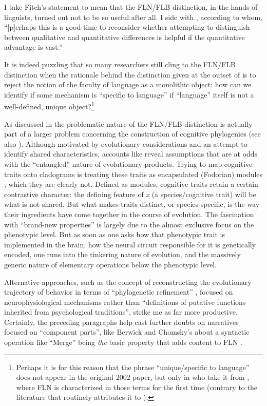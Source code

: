 I take Fitch's statement to mean that the FLN/FLB distinction, in the hands of linguists, turned out not to be so useful after all. I side with \cite{bloomfield2011birds}, according to whom, ``[p]erhaps this is a good time to reconsider whether attempting to distinguish between qualitative and quantitative differences is helpful if the quantitative advantage is vast.''

It is indeed puzzling that so many researchers still cling to the FLN/FLB distinction when the rationale behind the distinction given at the outset of \cite{hauser2002faculty} is to reject the notion of the faculty of language as a monolithic object: how can we identify if some mechanism is ``specific to language'' if ``language'' itself is not a well-defined, unique object?\footnote{Perhaps it is for this reason that the phrase
``unique/specific to language'' does not appear in the original 2002 paper, but only in \cite{fitch2005evolution} who take it from \cite{pinker2005faculty}, where FLN is characterized in those terms for the first time (contrary to the literature that routinely attributes it to \cite{hauser2002faculty}).}

As discussed in \cite{theofanopoulou2015cognitive} the problematic nature of the FLN/FLB distinction is actually part of a larger problem concerning the construction of cognitive phylogenies (see also \cite{martins2020vocal}). Although motivated by evolutionary considerations and an attempt to identify shared characteristics, accounts like \cite{fitch2010social} reveal assumptions that are at odds with the ``entangled'' nature of evolutionary products. Trying to map cognitive traits onto cladograms is treating these traits as encapsulated (Fodorian) modules \citep{fodor1983modularity}, which they are clearly not. Defined as modules, cognitive traits retain a certain contrastive character: the defining feature of \textit{x} (a species/cognitive trait) will be what is not shared. But what makes traits distinct, or species-specific, is the way their ingredients have come together in the course of evolution. The fascination with ``brand-new properties'' is largely due to the almost exclusive focus on the phenotypic level. But as soon as one asks how that phenotypic trait is implemented in the brain, how the neural circuit responsible for it is genetically encoded, one runs into the tinkering nature of evolution, and the massively generic nature of elementary operations below the phenotypic level.

Alternative approaches, such as the concept of reconstructing the evolutionary trajectory of behavior in terms of ``phylogenetic refinement'' \citep{cisek2019resynthesizing}, focused on neurophysiological mechanisms rather than ``definitions of putative functions inherited from psychological traditions'', strike me as far more productive. Certainly, the preceding paragraphs help cast further doubts on narratives focused on ``component parts'', like Berwick and Chomsky's about a syntactic operation like ``Merge'' being \textit{the} basic property that adds content to FLN \citep{berwick2016only}.

